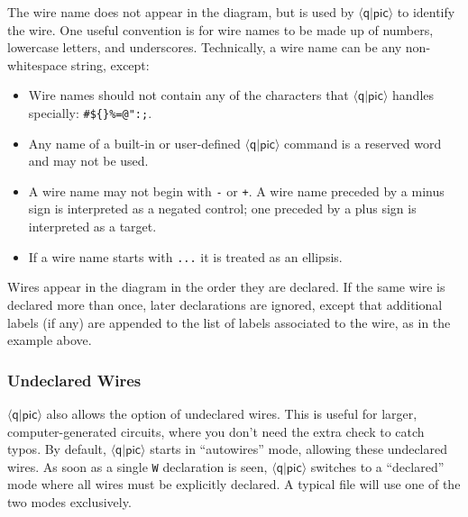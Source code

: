 \documentclass[twoside,12pt]{article}
\newcommand{\qpic}{$\langle\mathsf{q}|\mathsf{pic}\rangle$\xspace}
\begin{document}
The wire name does not appear in the diagram, but is used by \qpic to identify the wire.
One useful convention is for wire names to be made up of numbers, lowercase letters,
and underscores.  Technically, a wire name can be any non-whitespace string, except:
\begin{itemize}
\item Wire names should not contain any of the characters that \qpic handles specially:
{\tt {}\#\$\{\}\%=@":;}.
\item  Any name of a built-in or user-defined \qpic command is a reserved word and may not be used.
\item  A wire name may not begin with {\tt -} or {\tt +}.  A wire name preceded by a
  minus sign is interpreted as a negated control; one preceded by a plus sign is
  interpreted as a target.
\item  If a wire name starts with {\tt ...} it is treated as an ellipsis.
\end{itemize}

Wires appear in the diagram in the order they are declared.  If the same wire is declared
more than once, later declarations are ignored, except that additional labels (if any)
are appended to the list of labels associated to the wire, as in the example above.

\subsubsection{Undeclared Wires}

\qpic also allows the option of undeclared wires.  This is useful for larger,
computer-generated circuits, where you don't need the extra check to catch
typos.  By default, \qpic starts in ``autowires'' mode, allowing
these undeclared wires.  As soon as a single {\tt W} declaration is seen, \qpic
switches to a ``declared'' mode where all wires must be explicitly declared.
A typical file will use one of the two modes exclusively.
\end{document}
